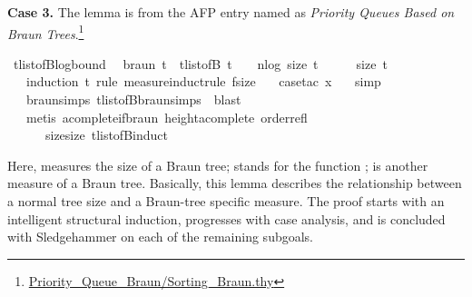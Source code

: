 \documentclass{article}
\begin{document}
{\bf Case 3.} The lemma  is from the AFP entry named as \emph{Priority Queues Based on Braun Trees}.\footnote{\url{Priority_Queue_Braun/Sorting_Braun.thy}}
\begin{mdframed}
\begin{isabelle}
\isamarkupfalse \ t{\isacharunderscore}{\kern0pt}list{\isacharunderscore}{\kern0pt}of{\isacharunderscore}{\kern0pt}B{\isacharunderscore}{\kern0pt}log{\isacharunderscore}{\kern0pt}bound{\isacharcolon}{\kern0pt}\isanewline
\ \ {\isachardoublequoteopen}braun\ t\ {\isasymLongrightarrow}\ t{\isacharunderscore}{\kern0pt}list{\isacharunderscore}{\kern0pt}of{\isacharunderscore}{\kern0pt}B\ t\ {\isasymle}\ {}\ {\isacharasterisk}{\kern0pt}\ {\isacharparenleft}{\kern0pt}nlog{}\ {\isacharparenleft}{\kern0pt}size\ t\ {\isacharplus}{\kern0pt}\ {}{\isacharparenright}{\kern0pt}\ {\isacharplus}{\kern0pt}\ {}{\isacharparenright}{\kern0pt}\ {\isacharasterisk}{\kern0pt}\ size\ t{\isachardoublequoteclose}\isanewline
\ \ \isamarkupfalse \ {\isacharparenleft}{\kern0pt}induction\ t\ rule{\isacharcolon}{\kern0pt}\ measure{\isacharunderscore}{\kern0pt}induct{\isacharunderscore}{\kern0pt}rule{\isacharbrackleft}{\kern0pt}\ f{\isacharequal}{\kern0pt}size{\isacharbrackright}{\kern0pt}{\isacharparenright}{\kern0pt}\isanewline
\ \ \isamarkupfalse \ {\isacharparenleft}{\kern0pt}case{\isacharunderscore}{\kern0pt}tac\ x{\isacharparenright}{\kern0pt}\isanewline
\ \ \isamarkupfalse \ simp\isanewline
\ \ \isamarkupfalse \ braun{\isachardot}{\kern0pt}simps{\isacharparenleft}{\kern0pt}{}{\isacharparenright}{\kern0pt}\ t{\isacharunderscore}{\kern0pt}list{\isacharunderscore}{\kern0pt}of{\isacharunderscore}{\kern0pt}B{\isacharunderscore}{\kern0pt}braun{\isacharunderscore}{\kern0pt}simps{\isacharparenleft}{\kern0pt}{}{\isacharparenright}{\kern0pt}\ \isamarkupfalse \ blast\isanewline
\ \ \isamarkupfalse \ {\isacharparenleft}{\kern0pt}metis\ acomplete{\isacharunderscore}{\kern0pt}if{\isacharunderscore}{\kern0pt}braun\ height{\isacharunderscore}{\kern0pt}acomplete\ order{\isacharunderscore}{\kern0pt}refl\ \isanewline
\ \ \ \ \ \ size{}{\isacharunderscore}{\kern0pt}size\ t{\isacharunderscore}{\kern0pt}list{\isacharunderscore}{\kern0pt}of{\isacharunderscore}{\kern0pt}B{\isacharunderscore}{\kern0pt}induct{\isacharparenright}{\kern0pt}\end{isabelle}
\end{mdframed}
Here,  measures the size of a Braun tree;  stands for the function ;  is another measure of a Braun tree. Basically, this lemma describes the relationship between a normal tree size and a Braun-tree specific measure. The proof starts with an intelligent structural induction, progresses with case analysis, and is concluded with Sledgehammer on each of the remaining subgoals. 
\end{document}
